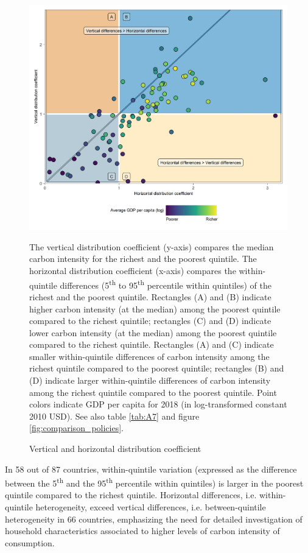 \documentclass[12pt, a4paper]{article}
\newenvironment{subcaption2}
{\strut
\vspace{-5pt}
\begin{minipage}[b]{0.9\textwidth}
  \hspace*{-\parindent}
  \footnotesize}
 {\end{minipage}}
\begin{document}
\begin{figure}[ht!]
    \centering
    \includegraphics{Figure 2/Figure_2_2017}
    \caption{Vertical and horizontal distribution coefficient}
    \label{fig:fig_2}
    \begin{subcaption2}
    The vertical distribution coefficient (y-axis) compares the median carbon intensity for the richest and the poorest quintile. The horizontal distribution coefficient (x-axis) compares the within-quintile differences (5\textsuperscript{th} to 95\textsuperscript{th} percentile within quintiles) of the richest and the poorest quintile. Rectangles (A) and (B) indicate higher carbon intensity (at the median) among the poorest quintile compared to the richest quintile; rectangles (C) and (D) indicate lower carbon intensity (at the median) among the poorest quintile compared to the richest quintile. Rectangles (A) and (C) indicate smaller within-quintile differences of carbon intensity among the richest quintile compared to the poorest quintile; rectangles (B) and (D) indicate larger within-quintile differences of carbon intensity among the richest quintile compared to the poorest quintile. Point colors indicate GDP per capita for 2018 (in log-transformed constant 2010 USD). See also table \ref{tab:A7} and figure \ref{fig:comparison_policies}.
    \end{subcaption2}
\end{figure}

In 58 out of 87 countries, within-quintile variation (expressed as the difference between the 5\textsuperscript{th} and the 95\textsuperscript{th} percentile within quintiles) is larger in the poorest quintile compared to the richest quintile. Horizontal differences, i.e. within-quintile heterogeneity, exceed vertical differences, i.e. between-quintile heterogeneity in 66 countries, emphasizing the need for detailed investigation of household characteristics associated to higher levels of carbon intensity of consumption.
\end{document}

